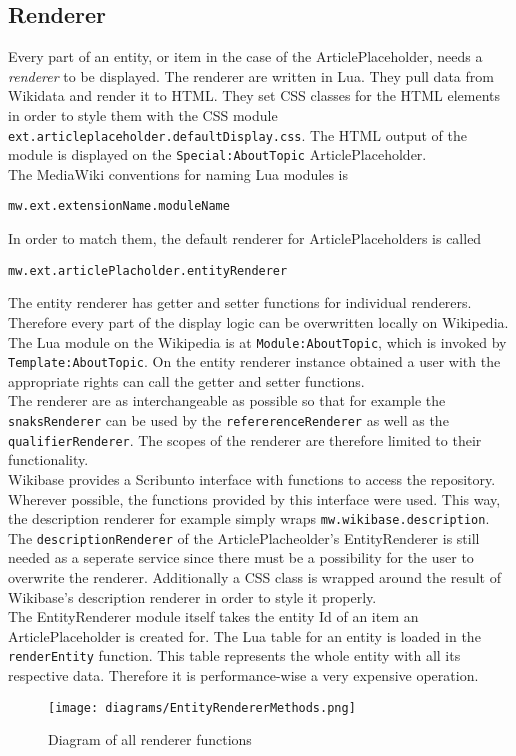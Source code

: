 \subsection{Renderer}

Every part of an entity, or item in the case of the ArticlePlaceholder, needs a \textit{renderer} to be displayed. The renderer are written in Lua. They pull data from Wikidata and render it to HTML. They set CSS classes for the HTML elements in order to style them with the CSS module \texttt{\justify ext.articleplaceholder.defaultDisplay.css}. The HTML output of the module is displayed on the \texttt{\justify Special:AboutTopic} ArticlePlaceholder. \\
The MediaWiki conventions for naming Lua modules is 
\begin{center}
\texttt{\justify mw.ext.extensionName.moduleName} 
\end{center}
In order to match them, the default renderer for ArticlePlaceholders is called 
\begin{center}
\texttt{\justify mw.ext.articlePlacholder.entityRenderer}
\end{center}
The entity renderer has getter and setter functions for individual renderers. Therefore every part of the display logic can be overwritten locally on Wikipedia. \\
The Lua module on the Wikipedia is at \texttt{\justify Module:AboutTopic}, which is invoked by \texttt{\justify Template:AboutTopic}. On the entity renderer instance obtained a user with the appropriate rights can call the getter and setter functions. \\
The renderer are as interchangeable as possible so that for example the \texttt{\justify snaksRenderer} can be used by the \texttt{\justify refererenceRenderer} as well as the \texttt{\justify qualifierRenderer}. The scopes of the renderer are therefore limited to their functionality. \\
Wikibase provides a Scribunto interface with functions to access the repository. Wherever possible, the functions provided by this interface were used. This way, the description renderer for example simply wraps \texttt{\justify mw.wikibase.description}. The \texttt{\justify descriptionRenderer} of the ArticlePlacheolder's EntityRenderer is still needed as a seperate service since there must be a possibility for the user to overwrite the renderer. Additionally a CSS class is wrapped around the result of Wikibase's description renderer in order to style it properly. \\
The EntityRenderer module itself takes the entity Id of an item an ArticlePlaceholder is created for. The Lua table for an entity is loaded in the \texttt{\justify renderEntity} function. This table represents the whole entity with all its respective data. Therefore it is performance-wise a very expensive operation. \\

\begin{figure}[H]
	\centering
	\texttt{[image: diagrams/EntityRendererMethods.png]}
	\caption{Diagram of all renderer functions}
	\label{fig:renderer}
\end{figure}